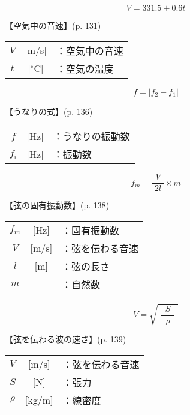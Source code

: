 \documentclass[10pt]{jarticle}
\begin{document}
\[
V = 331.5 + 0.6t
\]


\vskip3mm
【空気中の音速】{\footnotesize (p. 131)}

\begin{tabular}{ccl}
$V$	&[m/s]	&：空気中の音速\\
$t$	&[$^\circ$C]	&：空気の温度\\
\end{tabular}

\newpage





\[
f = |f_2 - f_1|
\]


\vskip3mm
【うなりの式】{\footnotesize (p. 136)}

\begin{tabular}{ccl}
$f$	&[Hz]	&：うなりの振動数\\
$f_i$	&[Hz]	&：振動数\\
\end{tabular}

\newpage




\[
f_m = \frac{V}{\; 2l \;}\times m
\]


\vskip3mm
【弦の固有振動数】{\footnotesize (p. 138)}

\begin{tabular}{ccl}
$f_m$	&[Hz]	&：固有振動数\\
$V$	&[m/s]	&：弦を伝わる音速\\
$l$	&[m]	&：弦の長さ\\
$m$	&	&：自然数\\
\end{tabular}

\newpage




\[
V = \sqrt{\,\, \frac{S}{\;\; \rho \;\;}\,\,}
\]


\vskip3mm
【弦を伝わる波の速さ】{\footnotesize (p. 139)}

\begin{tabular}{ccl}
$V$	&[m/s]	&：弦を伝わる音速\\
$S$	&[N]	&：張力\\
$\rho$	&[kg/m]	&：線密度\\
\end{tabular}

\newpage
\end{document}
